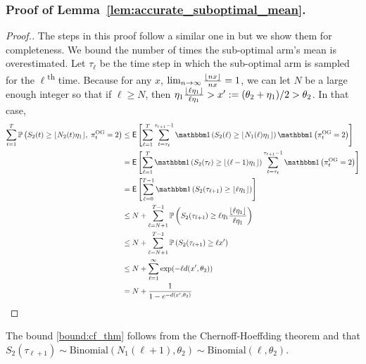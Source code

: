 \subsubsection{Proof of Lemma~\ref{lem:accurate_suboptimal_mean}.} \label{prf:proof_of_acc_sub_means}
\begin{proof}[Proof.]
	The steps in this proof follow a similar one in \cite{agrawal2013further} but we show them for completeness. We bound the number of times the sub-optimal arm's mean is overestimated. Let $\tau_\ell$ be the time step in which the  sub-optimal arm is sampled for the $\ell$\textsuperscript{th} time. Because for any $x$, $\lim_{n\to\infty}\frac{\lfloor nx\rfloor}{nx} = 1$, we can let $N$ be a large enough integer so that if $\ell \ge N$, then $\eta_1 \frac{\lfloor\ell \eta_1\rfloor}{\ell \eta_1} > x' := (\theta_2 + \eta_1)/2 > \theta_2$. In that case,
	\begin{align}
	\sum_{t=1}^T\P{S_2(t) \ge \floor{N_2(t) \eta_1}, \; \pi^{\rm OG}_t = 2} & \le \Ee{\sum_{\ell=1}^T \sum_{t=\tau_\ell}^{\tau_{\ell+1}-1}\ind{S_2(\ell) \ge \floor{N_1(\ell) \eta_1}} \ind{\pi^{\rm OG}_t = 2}} \nonumber \\
	& = \Ee{\sum_{\ell=1}^T \ind{S_2(\tau_{\ell}) \ge \floor{(\ell-1) \eta_1}} \sum_{t=\tau_\ell}^{\tau_{\ell+1}-1} \ind{\pi^{\rm OG}_t = 2}} \nonumber\\
	& = \Ee{\sum_{\ell=0}^{T-1} \ind{S_2(\tau_{\ell+1}) \ge \floor{\ell \eta_1}}} \nonumber\\
	& \le  N + \sum_{\ell=N+1}^{T-1} \P{ S_2(\tau_{\ell+1}) \ge \ell \eta_1 \frac{\floor{\ell \eta_1}}{\ell \eta_1}} \nonumber \\
	& \le N + \sum_{\ell=N+1}^{T-1} \P{ S_2(\tau_{\ell+1}) \ge \ell x'} \nonumber \\
	& \le  N + \sum_{\ell=1}^{\infty} \exp(-\ell d(x', \theta_2)) \label{bound:cf_thm} \\
	& = N + \frac{1}{1 - e^{-d(x',\theta_2)}} \nonumber
	\end{align}
\end{proof}
The bound \eqref{bound:cf_thm} follows from the Chernoff-Hoeffding theorem and that $S_2(\tau_{\ell+1}) \sim \text{Binomial}(N_1(\ell+1), \theta_2) \sim \text{Binomial}(\ell, \theta_2)$.
